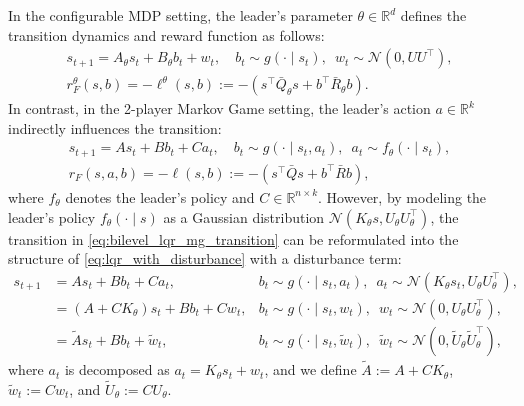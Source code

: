 \documentclass[letterpaper]{article} %
\providecommand{\R}{\mathbb{R}} %
\begin{document}
In the configurable MDP setting, the leader's parameter $\theta\in\R^d$ defines the transition dynamics and reward function as follows:
\begin{gather}
    s_{t+1} = A_{\theta} s_{t} + B_{\theta} b_{t} + w_t,  \quad b_{t}\sim g(\cdot\mid s_{t}),\enspace w_t\sim  \mathcal{N}(0,UU^\top), \label{eq:bilevel_lqr_cmdp_transition}\\
    r_F^{\theta}(s, b) = -\ell^{\theta}(s,b) := - (s^{\top} \bar{Q}_{\theta} s + b^{\top} \bar{R}_{\theta} b).
\end{gather}
In contrast, in the 2-player Markov Game setting, the leader's action $a\in\R^k$ indirectly influences the transition:
\begin{gather}
    s_{t+1} = A s_{t} + B b_{t} + C a_{t},\quad b_{t}\sim g(\cdot\mid s_{t},a_{t}),\enspace a_{t}\sim f_{\theta}(\cdot\mid s_{t}), \label{eq:bilevel_lqr_mg_transition}\\
    r_F(s, a, b) = -\ell(s,b) :=  - (s^{\top} \bar{Q} s + b^{\top} \bar{R} b),
\end{gather}
where $f_{\theta}$ denotes the leader's policy and $C\in\R^{n\times k}$.
However, by modeling the leader's policy $f_\theta(\cdot\mid s)$ as a Gaussian distribution $\mathcal{N}(K_\theta s, U_{\theta}U_{\theta}^\top)$, the transition in \eqref{eq:bilevel_lqr_mg_transition} can be reformulated into the structure of \eqref{eq:lqr_with_disturbance} with a disturbance term:
\begin{subequations}
\begin{align}
    s_{t+1} &= A s_{t} + B b_{t} + C a_{t}, &b_{t}\sim g(\cdot\mid s_{t},a_{t}),\enspace a_{t}\sim \mathcal{N}(K_{\theta}s_{t},U_{\theta}U_{\theta}^\top),\\
    &= (A + CK_{\theta}) s_{t} + B b_{t} + C w_{t}, &b_{t}\sim g(\cdot\mid s_{t},w_{t}),\enspace w_{t}\sim\mathcal{N}(0,U_{\theta}U_{\theta}^\top),\\
    &= \tilde{A} s_{t} + B b_{t} + \tilde{w}_{t}, &b_{t}\sim g(\cdot\mid s_{t},\tilde{w}_{t}),\enspace \tilde{w}_{t}\sim\mathcal{N}(0,\tilde{U}_{\theta}\tilde{U}_{\theta}^\top),\label{eq:bilevel_lqr_mg_transition_observable}
\end{align}
\end{subequations}
where $a_t$ is decomposed as $a_t=K_{\theta}s_{t}+w_{t}$, and we define $\tilde{A}:=A+CK_{\theta}$, $\tilde{w}_t:=Cw_{t}$, and $\tilde{U}_{\theta}:=CU_{\theta}$.
\end{document}
